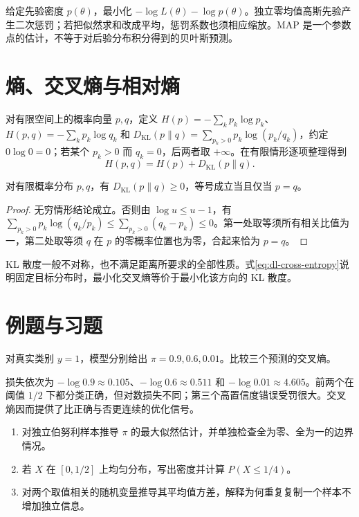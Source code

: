 \documentclass[UTF8,12pt,a4paper,fontset=fandol]{ctexbook}
\begin{document}
给定先验密度 $p(\theta)$，最小化 $-\log L(\theta)-\log p(\theta)$。独立零均值高斯先验产生二次惩罚；若把似然求和改成平均，惩罚系数也须相应缩放。MAP 是一个参数点的估计，不等于对后验分布积分得到的贝叶斯预测。

\section{熵、交叉熵与相对熵}
对有限空间上的概率向量 $p,q$，定义 $H(p)=-\sum_kp_k\log p_k$、 $H(p,q)=-\sum_kp_k\log q_k$ 和 $D_{\mathrm{KL}}(p\|q)=\sum_{p_k>0}p_k\log(p_k/q_k)$，约定 $0\log0=0$；若某个 $p_k>0$ 而 $q_k=0$，后两者取 $+\infty$。在有限情形逐项整理得到
\begin{equation}
H(p,q)=H(p)+D_{\mathrm{KL}}(p\|q).
\label{eq:dl-cross-entropy}
\end{equation}
\begin{proposition}[KL 散度非负]
对有限概率分布 $p,q$，有 $D_{\mathrm{KL}}(p\|q)\geq0$，等号成立当且仅当 $p=q$。
\end{proposition}
\begin{proof}
无穷情形结论成立。否则由 $\log u\leq u-1$，有 $\sum_{p_k>0}p_k\log(q_k/p_k)\leq\sum_{p_k>0}(q_k-p_k)\leq0$。第一处取等须所有相关比值为一，第二处取等须 $q$ 在 $p$ 的零概率位置也为零，合起来恰为 $p=q$。
\end{proof}
KL 散度一般不对称，也不满足距离所要求的全部性质。式\eqref{eq:dl-cross-entropy}说明固定目标分布时，最小化交叉熵等价于最小化该方向的 KL 散度。

\section{例题与习题}
\begin{example}[置信度与对数损失]
对真实类别 $y=1$，模型分别给出 $\pi=0.9,0.6,0.01$。比较三个预测的交叉熵。
\end{example}
\begin{solve}
损失依次为 $-\log0.9\approx0.105$、$-\log0.6\approx0.511$ 和 $-\log0.01\approx4.605$。前两个在阈值 $1/2$ 下都分类正确，但对数损失不同；第三个高置信度错误受罚很大。交叉熵因而提供了比正确与否更连续的优化信号。
\end{solve}
\begin{enumerate}
\item 对独立伯努利样本推导 $\pi$ 的最大似然估计，并单独检查全为零、全为一的边界情况。
\item 若 $X$ 在 $[0,1/2]$ 上均匀分布，写出密度并计算 $P(X\leq1/4)$。
\item 对两个取值相关的随机变量推导其平均值方差，解释为何重复复制一个样本不增加独立信息。
\end{enumerate}
\end{document}
